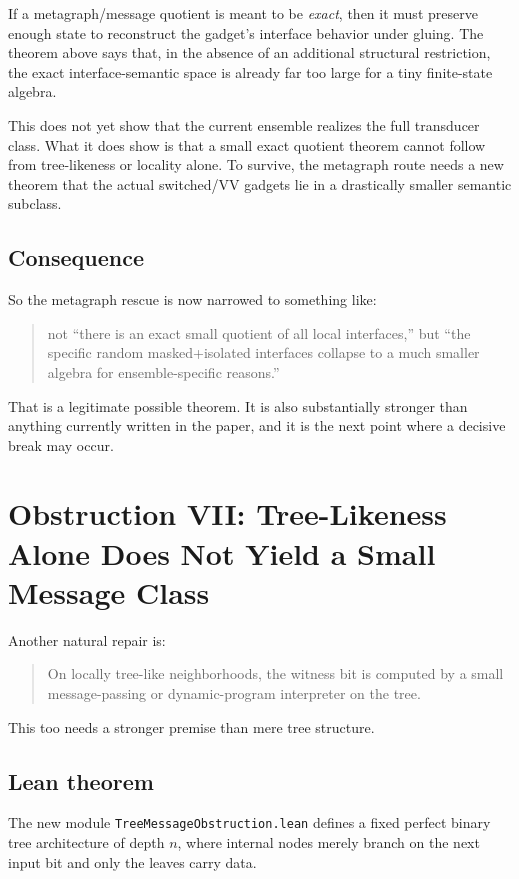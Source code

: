 \documentclass[11pt]{article}
\theoremstyle{remark}
\begin{document}
If a metagraph/message quotient is meant to be \emph{exact}, then it must preserve enough state to
reconstruct the gadget's interface behavior under gluing.  The theorem above says that, in the
absence of an additional structural restriction, the exact interface-semantic space is already far
too large for a tiny finite-state algebra.

This does not yet show that the current ensemble realizes the full transducer class.  What it
does show is that a small exact quotient theorem cannot follow from tree-likeness or locality
alone.  To survive, the metagraph route needs a new theorem that the actual switched/VV gadgets
lie in a drastically smaller semantic subclass.

\subsection{Consequence}

So the metagraph rescue is now narrowed to something like:
\begin{quote}
not ``there is an exact small quotient of all local interfaces,''
but ``the specific random masked+isolated interfaces collapse to a much smaller algebra for
ensemble-specific reasons.''
\end{quote}

That is a legitimate possible theorem.  It is also substantially stronger than anything currently
written in the paper, and it is the next point where a decisive break may occur.

\section{Obstruction VII: Tree-Likeness Alone Does Not Yield a Small Message Class}

Another natural repair is:
\begin{quote}
On locally tree-like neighborhoods, the witness bit is computed by a small message-passing or
dynamic-program interpreter on the tree.
\end{quote}

This too needs a stronger premise than mere tree structure.

\subsection{Lean theorem}

The new module \texttt{TreeMessageObstruction.lean} defines a fixed perfect binary tree
architecture of depth \(n\), where internal nodes merely branch on the next input bit and only the
leaves carry data.
\end{document}
